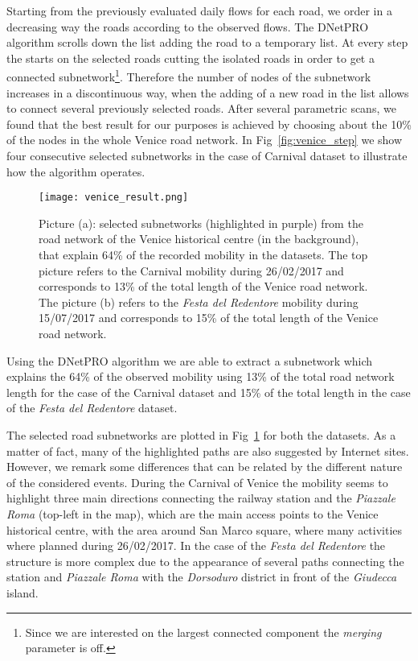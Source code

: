 \documentclass{standalone}
\begin{document}
Starting from the previously evaluated daily flows for each road, we order in a decreasing way the roads according to the observed
flows.
The DNetPRO algorithm scrolls down the list adding the road to a temporary list.
At every step the  starts on the selected roads cutting the isolated roads in order to get a connected subnetwork\footnote{
  Since we are interested on the largest connected component the \emph{merging} parameter is off.
}.
Therefore the number of nodes of the subnetwork increases in a discontinuous way, when the adding of a new road in the list allows to
connect several previously selected roads.
After several parametric scans, we found that the best result for our purposes is achieved by choosing about the 10\% of the nodes in the whole Venice road network.
In Fig~\ref{fig:venice_step} we show four consecutive selected subnetworks in the case of Carnival dataset to illustrate how the algorithm operates.

\begin{center}
\begin{figure}[htbp]
\centering
\texttt{[image: venice\_result.png]}
\caption{Picture (a): selected subnetworks (highlighted in purple) from the road network of the Venice historical centre (in the background), that explain 64\% of the recorded mobility in the datasets.
The top picture refers to the Carnival mobility during 26/02/2017 and corresponds to 13\% of the total length of the Venice road network.
The picture (b) refers to the \emph{Festa del Redentore} mobility during 15/07/2017 and corresponds to 15\% of the total length of the Venice road network.
}
\label{fig:venice_result}
\end{figure}
\end{center}

Using the DNetPRO algorithm we are able to extract a subnetwork which explains the 64\% of the observed mobility using 13\% of the total road network length for the case of the Carnival dataset and 15\% of the total length in the case of the \emph{Festa del Redentore} dataset.

The selected road subnetworks are plotted in Fig~\ref{fig:venice_result} for both the datasets.
As a matter of fact, many of the highlighted paths are also suggested by Internet sites.
However, we remark some differences that can be related by the different nature of the considered events.
During the Carnival of Venice the mobility seems to highlight three main directions connecting the railway station and the \emph{Piazzale Roma} (top-left in the map), which are the main access points to the Venice historical centre, with the area around San Marco square, where many activities where planned during 26/02/2017.
In the case of the \emph{Festa del Redentore} the structure is more complex due to the appearance of several paths connecting the station and \emph{Piazzale Roma} with the \emph{Dorsoduro} district in front of the \emph{Giudecca} island.
\end{document}
